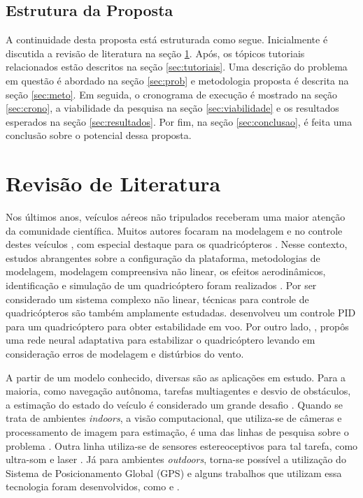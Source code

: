 \documentclass[a4paper, 12pt]{article}
\begin{document}


\subsection{Estrutura da Proposta}

A continuidade desta proposta está estruturada como segue. Inicialmente é discutida a revisão de literatura na seção \ref{sec:rev}. Após, os tópicos tutoriais relacionados estão descritos na seção \ref{sec:tutoriais}. Uma descrição do problema em questão é abordado na seção \ref{sec:prob} e metodologia proposta é descrita na seção \ref{sec:meto}. Em seguida, o cronograma de execução é mostrado na seção \ref{sec:crono}, a viabilidade da pesquisa na seção \ref{sec:viabilidade} e os resultados esperados na seção \ref{sec:resultados}. Por fim, na seção \ref{sec:conclusao}, é feita uma conclusão sobre o potencial dessa proposta. 

\newpage

\section{Revisão de Literatura}
\label{sec:rev}

Nos últimos anos, veículos aéreos não tripulados receberam uma maior atenção da comunidade científica. Muitos autores focaram na modelagem e no controle destes veículos \cite{Ye2006},  com especial destaque para os quadricópteros \cite{Altug2002}. Nesse contexto, estudos abrangentes sobre a configuração da plataforma, metodologias de modelagem, modelagem compreensiva não linear, os efeitos aerodinâmicos, identificação e simulação de um quadricóptero foram realizados \cite{Zhang2014} \cite{Gibiansky2010}. Por ser considerado um sistema complexo não linear, técnicas para controle de quadricópteros são também amplamente estudadas. \cite{Salih2010} desenvolveu um controle PID para um quadricóptero para obter estabilidade em voo. Por outro lado, \cite{Nicol2008}, propôs uma rede neural adaptativa para estabilizar o quadricóptero levando em consideração erros de modelagem e distúrbios do vento.

A partir de um modelo conhecido, diversas são as aplicações em estudo. Para a maioria, como navegação autônoma, tarefas multiagentes e desvio de obstáculos, a estimação do estado do veículo é considerado um grande desafio \cite{Achtelik2009}. Quando se trata de ambientes \textit{indoors}, a visão computacional, que utiliza-se de câmeras e processamento de imagem para estimação, é uma das linhas de pesquisa sobre o problema \cite{Shen2013} \cite{Blosch2010} \cite{Shen2013a}. Outra linha utiliza-se de sensores estereoceptivos para tal tarefa, como ultra-som \cite{Roberts2007} e laser \cite{Grzonka2012}. Já para ambientes \textit{outdoors}, torna-se possível a utilização do Sistema de Posicionamento Global (GPS) e alguns trabalhos que utilizam essa tecnologia foram desenvolvidos, como  \cite{Hoffmann2004} e \cite{Wendel2006}.
\end{document}
